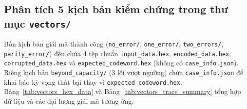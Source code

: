 \documentclass[11pt,a4paper]{report}
\begin{document}
\subsection{Phân tích 5 kịch bản kiểm chứng trong thư mục \texttt{vectors/}}

Bốn kịch bản giải mã thành công (\texttt{no\_error/}, \texttt{one\_error/}, \texttt{two\_errors/}, \texttt{parity\_error/}) đều chứa 4 tệp chuẩn \texttt{input\_data.hex}, \texttt{encoded\_data.hex}, \texttt{corrupted\_\allowbreak data.hex} và \texttt{expected\_\allowbreak codeword.hex} (không có \texttt{case\_\allowbreak info.json}). Riêng kịch bản \texttt{beyond\_\allowbreak capacity/} (3 lỗi vượt ngưỡng) chứa \texttt{case\_\allowbreak info.json} để khai báo kỳ vọng thất bại thay vì \texttt{expected\_\allowbreak codeword.hex}. Bảng~\ref{tab:vectors_hex_data} và Bảng~\ref{tab:vectors_trace_summary} tổng hợp dữ liệu và các đại lượng giải mã tương ứng.
\end{document}
